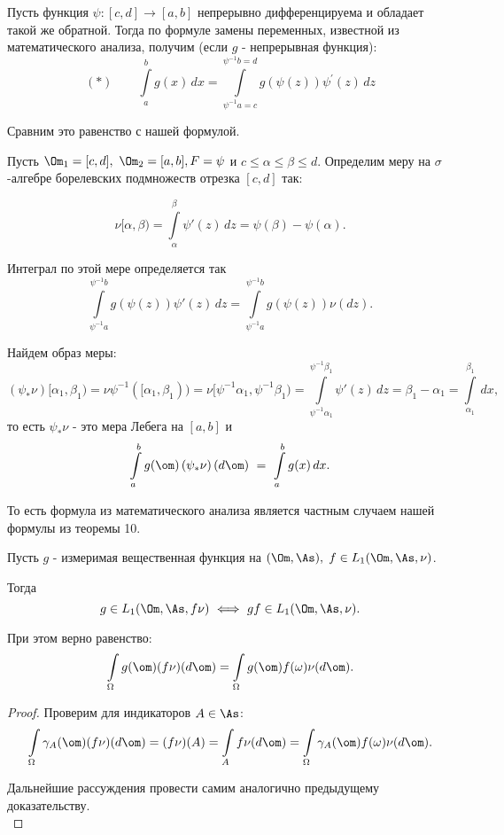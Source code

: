 \documentclass[a4paper]{article}
\newcommand{\fo}{f(\omega)}
\newcommand{\io} {\int \limits_{\Omega}}
\newcommand{\il} {\int\limits_}
\begin{document}
\begin{ex}
Пусть функция $\psi: [c,d] \rightarrow [a, b]$ непрерывно
дифференцируема и обладает такой же обратной. Тогда по формуле
замены переменных, известной из математического анализа, получим
(если $g$ - непрерывная функция):
$$(*) \qquad \int \limits_a^b g(x) \, dx = \int \limits_{\psi^{-1}a =
c}^{\psi^{-1}b =d} g (\psi(z)) \psi^{\prime} (z) \, dz$$

Сравним это равенство с нашей формулой.

Пусть $\Om_1 = [c,d], \ \Om_2 = [a,b], F = \psi$ и $c \leqslant
\alpha \leqslant \beta \leqslant d$. Определим меру на
$\sigma$-алгебре борелевских подмножеств отрезка $[c, d]$ так:

$$\nu[\alpha, \beta) = \int \limits_{\alpha}^{\beta} \psi'(z) \, dz
= \psi(\beta) - \psi(\alpha).$$

Интеграл по этой мере определяется так $$\int
\limits_{\psi^{-1}a}^{\psi^{-1}b} g (\psi(z)) \psi'(z) \, dz =\int
\limits_{\psi^{-1}a}^{\psi^{-1}b} g(\psi(z)) \nu(dz).$$

Найдем образ меры:
$$
(\psi_{*} \nu) [\alpha_1, \beta_1) = \nu
\psi^{-1} ([\alpha_1, \beta_1)) = \nu [\psi^{-1} \alpha_1,
\psi^{-1} \beta_1) = \int \limits_{\psi^{-1} \alpha_1}^{\psi^{-1}
\beta_1} \psi'(z) \, dz = \beta_1 - \alpha_1 = \int
\limits_{\alpha_1}^{\beta_1} \, dx,
$$
то есть $\psi_{*} \nu$ - это мера Лебега на $[a, b]$ и
$$
\il{a}^b g(\om)\, (\psi_{*} \nu) \, (d\om)\ = \ \il{a}^b g(x)\,
dx.
$$

То есть формула из математического анализа является частным
случаем нашей формулы из теоремы 10.
\end{ex}

\begin{prop}
Пусть $g$ - измеримая вещественная функция на $(\Om,
\As),$ \linebreak  $f \in L_1(\Om,\As, \nu)$.

Тогда $$g \in L_1(\Om,\As, f \nu)\ \Longleftrightarrow \
gf \in L_1(\Om,\As, \nu).$$

При этом верно равенство: $$\io g(\om) (f\nu)(d\om) = \io g(\om)
\fo \nu(d\om).$$
\end{prop}

\begin{proof}
Проверим для индикаторов $A \in \As$:
$$\io \gamma_{A}
(\om) (f \nu) (d\om) = (f\nu)(A) = \int \limits_A f \nu(d\om) =
\io \gamma_A (\om) \fo
\nu (d\om).$$

Дальнейшие рассуждения провести самим аналогично предыдущему доказательству.\\
\end{proof}
\end{document}

